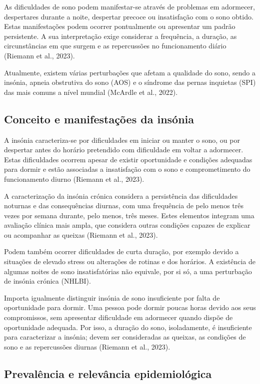 As dificuldades de sono podem manifestar-se através de problemas em adormecer, despertares durante a noite, despertar precoce ou insatisfação com o sono obtido. Estas manifestações podem ocorrer pontualmente ou apresentar um padrão persistente. A sua interpretação exige considerar a frequência, a duração, as circunstâncias em que surgem e as repercussões no funcionamento diário (Riemann et al., 2023).

Atualmente, existem várias perturbações que afetam a qualidade do sono, sendo a insónia, apneia obstrutiva do sono (AOS) e o síndrome das pernas inquietas (SPI) das mais comuns a nível mundial (McArdle et al., 2022). 

\subsection{Conceito e manifestações da insónia}
\label{sec:chap2_insomniaManifest}

A insónia caracteriza-se por dificuldades em iniciar ou manter o sono, ou por despertar antes do horário pretendido com dificuldade em voltar a adormecer. Estas dificuldades ocorrem apesar de existir oportunidade e condições adequadas para dormir e estão associadas a insatisfação com o sono e comprometimento do funcionamento diurno (Riemann et al., 2023).

A caracterização da insónia crónica considera a persistência das dificuldades noturnas e das consequências diurnas, com uma frequência de pelo menos três vezes por semana durante, pelo menos, três meses. Estes elementos integram uma avaliação clínica mais ampla, que considera outras condições capazes de explicar ou acompanhar as queixas (Riemann et al., 2023).

Podem também ocorrer dificuldades de curta duração, por exemplo devido a situações de elevado stress ou alterações de rotinas e dos horários. A existência de algumas noites de sono insatisfatórias não equivale, por si só, a uma perturbação de insónia crónica (NHLBI).

Importa igualmente distinguir insónia de sono insuficiente por falta de oportunidade para dormir. Uma pessoa pode dormir poucas horas devido aos seus compromissos, sem apresentar dificuldade em adormecer quando dispõe de oportunidade adequada. Por isso, a duração do sono, isoladamente, é insuficiente para caracterizar a insónia; devem ser consideradas as queixas, as condições de sono e as repercussões diurnas (Riemann et al., 2023).

\subsection{Prevalência e relevância epidemiológica}
\label{sec:chap2_prevalencia}

